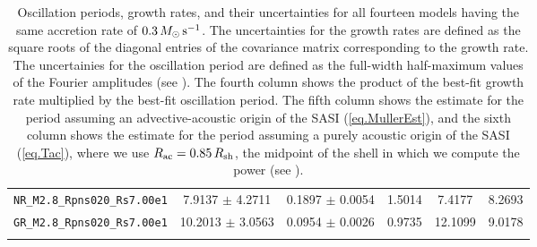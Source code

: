 \begin{table}[b]
\begin{tabularx}{0.7\textwidth}{cccccc}
    \texttt{NR\_M2.8\_Rpns020\_Rs7.00e1} & 7.9137 $\pm$ 4.2711 & 0.1897 $\pm$ 0.0054 & 1.5014 & 7.4177 & 8.2693 \\
    \texttt{GR\_M2.8\_Rpns020\_Rs7.00e1} & 10.2013 $\pm$ 3.0563 & 0.0954 $\pm$ 0.0026 & 0.9735 & 12.1099 & 9.0178 \\
    \bottomrule \\
  \end{tabularx}
  \caption{
Oscillation periods, growth rates, and their uncertainties for all
fourteen models having the same accretion rate of $0.3\,M_{\odot}\,\mathrm{s}^{-1}$.
The uncertainties for the growth rates are defined as the square roots of the
diagonal entries of the covariance matrix corresponding to the growth rate.
The uncertainies for the oscillation period are defined as the full-width
half-maximum values of the Fourier amplitudes (see ).
The fourth column shows the product of the best-fit growth rate multiplied
by the best-fit oscillation period.
The fifth column shows the estimate for the period assuming an
advective-acoustic origin of the SASI (\eqref{eq.MullerEst}),
and the sixth column shows the estimate for the period assuming
a purely acoustic origin of the SASI (\eqref{eq.Tac}), where we use
$R_{\mathrm{ac}}=0.85\,R_{\mathrm{sh}}$, the midpoint
of the shell in which we compute the power (see ).}
  \label{tab.results}
\end{table}
